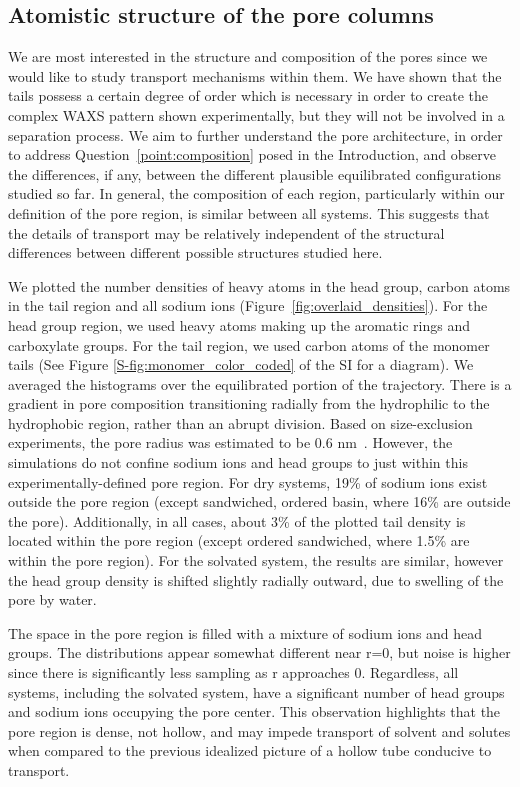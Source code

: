 \documentclass[journal=jpcbfk,manuscript=article]{achemso}
\begin{document}
  \subsection{Atomistic structure of the pore columns}

  We are most interested in the structure and composition of the pores since we
  would like to study transport mechanisms within them. We have shown that the
  tails possess a certain degree of order which is necessary in order to create
  the complex WAXS pattern shown experimentally, but they will not be involved in
  a separation process. We aim to further understand the pore architecture, in
  order to address Question~\ref{point:composition} posed in the Introduction, 
  and observe the differences, if any, between the different plausible equilibrated
  configurations studied so far. In general, the composition of each region, particularly within our
  definition of the pore region, is similar between all systems. This suggests
  that the details of transport may be relatively independent of the structural
  differences between different possible structures studied here.

  We plotted the number densities of heavy atoms in the head group, carbon atoms in the tail
  region and all sodium ions (Figure~\ref{fig:overlaid_densities}). For the head group
  region, we used heavy atoms making up the aromatic rings and carboxylate groups. For the tail
  region, we used carbon atoms of the monomer tails (See Figure \ref{S-fig:monomer_color_coded}
  of the SI for a diagram). We averaged the histograms over the equilibrated
  portion of the trajectory. 
  There is a gradient in pore composition transitioning radially from the hydrophilic 
  to the hydrophobic region, rather than an abrupt division. Based on size-exclusion 
  experiments, the pore radius was estimated to be 0.6 nm~\cite{zhou_supported_2005}. 
  However, the simulations do not confine
  sodium ions and head groups to just within this experimentally-defined pore region. For dry systems,
  19\% of sodium ions exist outside the pore region (except sandwiched, ordered basin,
  where 16\% are outside the pore). Additionally, in all cases, about 
  3\% of the plotted tail density is located within the pore region (except ordered sandwiched,
  where 1.5\% are within the pore region). For the solvated system, the results are similar,
  however the head group density is shifted slightly radially outward, due to
  swelling of the pore by water. 

  The space in the pore region is filled with a mixture of sodium ions
  and head groups. The distributions appear somewhat different near r=0, but noise 
  is higher since there is significantly less sampling as r approaches 0. Regardless, 
  all systems, including the solvated system, have a significant number of head groups 
  and sodium ions occupying the pore center. This observation highlights that the pore
  region is dense, not hollow, and may impede transport of solvent and solutes when
  compared to the previous idealized picture of a hollow tube conducive to transport.
  
\end{document}
